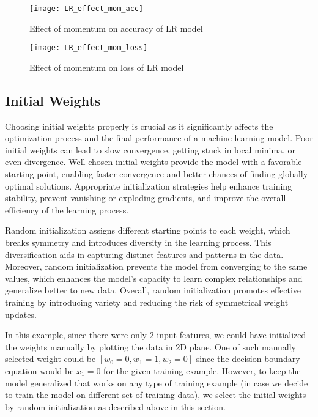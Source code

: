 \documentclass[12pt, a4paper, twoside]{article}
\begin{document}
\begin{figure}[h!]
	\centering
	\texttt{[image: LR\_effect\_mom\_acc]}
	\caption{Effect of momentum on  accuracy of LR model}
	\label{F:LR_effect_mom_acc}
\end{figure}
\begin{figure}[h!]
	\centering
	\texttt{[image: LR\_effect\_mom\_loss]}
	\caption{Effect of momentum on loss of LR model}
	\label{F:LR_effect_mom_loss}
\end{figure}

\subsection{Initial Weights}\label{SS:lr-w0}
Choosing initial weights properly is crucial as it significantly affects the optimization process and the final performance of a machine learning model. Poor initial weights can lead to slow convergence, getting stuck in local minima, or even divergence. Well-chosen initial weights provide the model with a favorable starting point, enabling faster convergence and better chances of finding globally optimal solutions. Appropriate initialization strategies help enhance training stability, prevent vanishing or exploding gradients, and improve the overall efficiency of the learning process.
\par
Random initialization assigns different starting points to each weight, which breaks symmetry and introduces diversity in the learning process. This diversification aids in capturing distinct features and patterns in the data. Moreover, random initialization prevents the model from converging to the same values, which enhances the model's capacity to learn complex relationships and generalize better to new data. Overall, random initialization promotes effective training by introducing variety and reducing the risk of symmetrical weight updates. 
\par
In this example, since there were only 2 input features, we could have initialized the weights manually by plotting the data in 2D plane. One of such manually selected weight could be $[w_0 = 0, w_1 = 1, w_2 = 0]$ since the decision boundary equation would be $x_1 = 0$ for the given training example. However, to keep the model generalized that works on any type of training example (in case we decide to train the model on different set of training data), we select the initial weights by random initialization as described above in this section.
\end{document}

